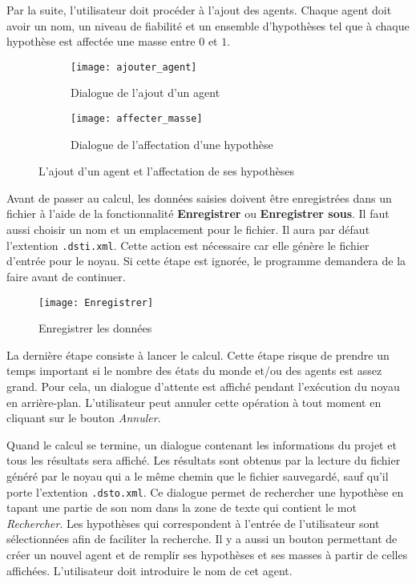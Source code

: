 Par la suite, l'utilisateur doit procéder à l'ajout des agents. Chaque agent doit avoir un nom, un niveau de
fiabilité et un ensemble d'hypothèses tel que à chaque hypothèse est affectée une masse entre
$0$ et $1$.\\[1em]

\begin{figure}[H]
\begin{subfigure}{0.49\textwidth}
\texttt{[image: ajouter\_agent]}
\caption{Dialogue de l'ajout d'un agent}
\end{subfigure}
\hfill
\begin{subfigure}{0.49\textwidth}
\texttt{[image: affecter\_masse]}
\caption{Dialogue de l'affectation d'une hypothèse}
\end{subfigure}
\caption{L'ajout d'un agent et l'affectation de ses hypothèses}
\end{figure}

Avant de passer au calcul, les données saisies doivent être enregistrées dans un fichier à l'aide de la fonctionnalité
\textbf{Enregistrer} ou \textbf{Enregistrer sous}. Il faut aussi choisir un nom et un emplacement pour le
fichier. Il aura par défaut l'extention \texttt{.dsti.xml}. Cette action est nécessaire car elle génère
le fichier d'entrée pour le noyau. Si cette étape est ignorée, le programme demandera de la faire avant de
continuer.\\[1em]

\begin{figure}[H]
\centering
\texttt{[image: Enregistrer]}
\caption{Enregistrer les données}
\end{figure}

La dernière étape consiste à lancer le calcul. Cette étape risque de prendre un temps important si le nombre des états
du monde et/ou des agents est assez grand. Pour cela, un dialogue d'attente est affiché pendant l'exécution
du noyau en arrière-plan. L'utilisateur peut annuler cette opération à tout moment en cliquant sur le bouton
\emph{Annuler}.

Quand le calcul se termine, un dialogue contenant les informations du projet et tous les résultats sera affiché.
Les résultats sont obtenus par la lecture du fichier généré par le noyau qui a le même chemin que le fichier
sauvegardé, sauf qu'il porte l'extention \texttt{.dsto.xml}. Ce dialogue permet de rechercher une hypothèse en
tapant une partie de son nom dans la zone de texte qui contient le mot \emph{Rechercher}.
Les hypothèses qui correspondent à l'entrée de l'utilisateur sont sélectionnées afin de faciliter
la recherche. Il y a aussi un bouton permettant de créer un nouvel agent et de remplir ses hypothèses et ses masses
à partir de celles affichées. L'utilisateur doit introduire le nom de cet agent.

